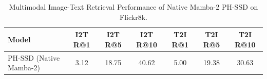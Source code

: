 \begin{table}[h]
\centering
\caption{Multimodal Image-Text Retrieval Performance of Native Mamba-2 PH-SSD on Flickr8k.}
\begin{tabular}{lcccccc}
\toprule
\textbf{Model} & \textbf{I2T R@1} & \textbf{I2T R@5} & \textbf{I2T R@10} & \textbf{T2I R@1} & \textbf{T2I R@5} & \textbf{T2I R@10} \\
\midrule
PH-SSD (Native Mamba-2) & 3.12 & 18.75 & 40.62 & 5.00 & 19.38 & 30.63 \\
\bottomrule
\end{tabular}
\end{table}
